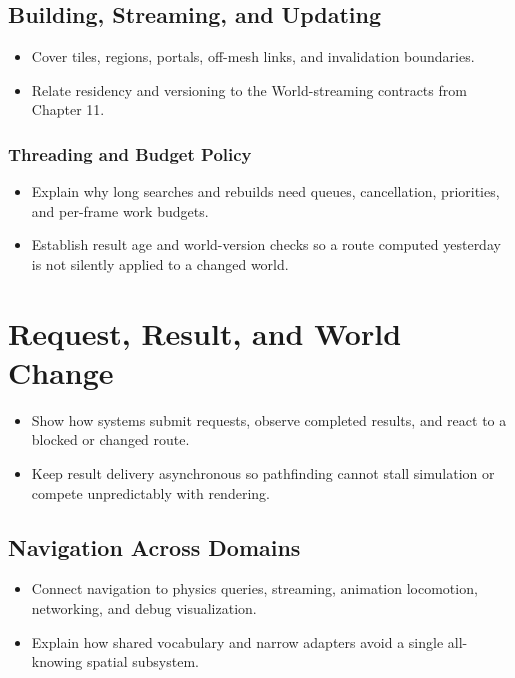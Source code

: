 \documentclass[
  11pt,
  letterpaper,
  DIV=11,
  numbers=noendperiod,
  twoside,
  open=right]{scrreprt}
\providecommand{\tightlist}{%
  \setlength{\itemsep}{0pt}\setlength{\parskip}{0pt}}
\begin{document}
\subsection{Building, Streaming, and
Updating}\label{building-streaming-and-updating}

\begin{itemize}
\tightlist
\item
  Cover tiles, regions, portals, off-mesh links, and invalidation
  boundaries.
\item
  Relate residency and versioning to the World-streaming contracts from
  Chapter 11.
\end{itemize}

\subsubsection{Threading and Budget
Policy}\label{threading-and-budget-policy}

\begin{itemize}
\tightlist
\item
  Explain why long searches and rebuilds need queues, cancellation,
  priorities, and per-frame work budgets.
\item
  Establish result age and world-version checks so a route computed
  yesterday is not silently applied to a changed world.
\end{itemize}

\section{Request, Result, and World
Change}\label{request-result-and-world-change}

\begin{itemize}
\tightlist
\item
  Show how systems submit requests, observe completed results, and react
  to a blocked or changed route.
\item
  Keep result delivery asynchronous so pathfinding cannot stall
  simulation or compete unpredictably with rendering.
\end{itemize}

\subsection{Navigation Across Domains}\label{navigation-across-domains}

\begin{itemize}
\tightlist
\item
  Connect navigation to physics queries, streaming, animation
  locomotion, networking, and debug visualization.
\item
  Explain how shared vocabulary and narrow adapters avoid a single
  all-knowing spatial subsystem.
\end{itemize}
\end{document}
